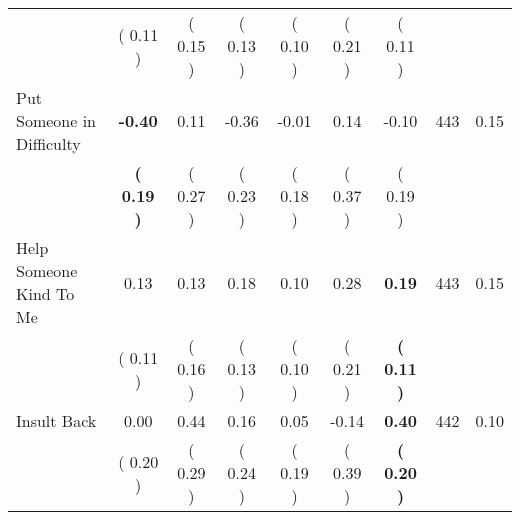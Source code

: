 \begin{tabular}{lcccccccc}
 & (     0.11 ) & (     0.15 ) & (     0.13 ) & (     0.10 ) & (     0.21 ) & (     0.11 ) & \\
Put Someone in Difficulty & \textbf{    -0.40} &      0.11 &     -0.36 &     -0.01 &      0.14 &     -0.10 & 443 &       0.15 \\ 
 & \textbf{(     0.19 )} & (     0.27 ) & (     0.23 ) & (     0.18 ) & (     0.37 ) & (     0.19 ) & \\
Help Someone Kind To Me &      0.13 &      0.13 &      0.18 &      0.10 &      0.28 & \textbf{     0.19} & 443 &       0.15 \\ 
 & (     0.11 ) & (     0.16 ) & (     0.13 ) & (     0.10 ) & (     0.21 ) & \textbf{(     0.11 )} & \\
Insult Back &      0.00 &      0.44 &      0.16 &      0.05 &     -0.14 & \textbf{     0.40} & 442 &       0.10 \\ 
 & (     0.20 ) & (     0.29 ) & (     0.24 ) & (     0.19 ) & (     0.39 ) & \textbf{(     0.20 )} & \\
\bottomrule
\end{tabular}
